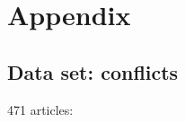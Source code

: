 \chapter{Appendix}


\section{Data set: conflicts}

\begin{multicols}{2}\scriptsize
471 articles:\\

\end{multicols}
